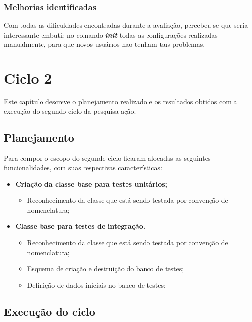       
      \subsection{Melhorias identificadas}
	  Com todas as dificuldades encontradas durante a avaliação, percebeu-se que seria interessante embutir no comando 
	  \textit{\textbf{init}} todas as configurações realizadas manualmente, para que novos usuários não tenham tais problemas.
    

\chapter{Ciclo 2}

  Este capítulo descreve o planejamento realizado e os resultados obtidos com a execução do segundo ciclo da pesquisa-ação.
  
  \section{Planejamento}
  
      Para compor o escopo do segundo ciclo ficaram alocadas as seguintes funcionalidades, com suas respectivas características:
      
     \begin{itemize}
      \item \textbf{Criação da classe base para testes unitários;}
	\begin{itemize}
	  \item Reconhecimento da classe que está sendo testada por convenção de nomenclatura;
	\end{itemize}

      \item \textbf{Classe base para testes de integração.}
	\begin{itemize}
	  \item Reconhecimento da classe que está sendo testada por convenção de nomenclatura;
	  \item Esquema de criação e destruição do banco de testes;
	  \item Definição de dados iniciais no banco de testes;
	\end{itemize}
      \end{itemize}

  \section{Execução do ciclo}
      
